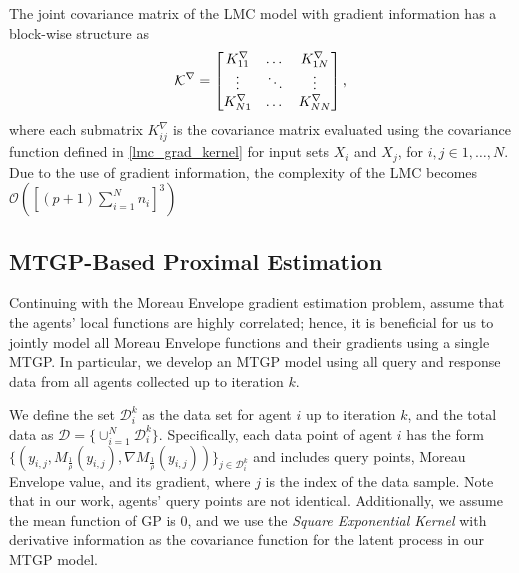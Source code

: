 \documentclass[conference]{IEEEtran}
\begin{document}
The joint covariance matrix of the LMC model with gradient information has a block-wise structure as
\begin{equation}
    \mathcal{K}^{\nabla} = \begin{bmatrix}
        K^{\nabla}_{11} & \dots & K^{\nabla}_{1N} \\
        \vdots & \ddots & \vdots \\
        K^{\nabla}_{N1} & \dots & K^{\nabla}_{NN}
    \end{bmatrix}\text,
    \label{lcm_grad_cov_matrix}
\end{equation}
where each submatrix $K^{\nabla}_{ij}$ is the covariance matrix evaluated using the covariance function defined in \eqref{lmc_grad_kernel} for input sets $X_i$ and $X_j$, for $i,j \in 1, \dots, N$. 
Due to the use of gradient information, the complexity of the LMC becomes $\mathcal{O}([(p+1)\sum_{i=1}^N n_i]^3)$

\subsection{MTGP-Based Proximal Estimation}

Continuing with the Moreau Envelope gradient estimation problem, assume that the agents' local functions are highly correlated; hence, it is beneficial for us to jointly model all Moreau Envelope functions and their gradients using a single MTGP. In particular, we develop an MTGP model using all query and response data from all agents collected up to iteration $k$. 

We define the set $\mathcal{D}_i^k$ as the data set for agent $i$ up to iteration $k$, and the total data as $\mathcal{D} = \{\cup_{i=1}^N \mathcal{D}_i^k\}$. 
Specifically, each data point of agent $i$ has the form $\{(y_{i,j}, M_{\frac{1}{\rho}}(y_{i,j}), \nabla M_{\frac{1}{\rho}}(y_{i,j}))\}_{j \in \mathcal{D}_i^k}$ and includes query points, Moreau Envelope value, and its gradient, where $j$ is the index of the data sample. 
Note that in our work, agents' query points are not identical. Additionally, we assume the mean function of GP is $0$, and we use the \textit{Square Exponential Kernel} with derivative information as the covariance function for the latent process in our MTGP model. 
\end{document}
